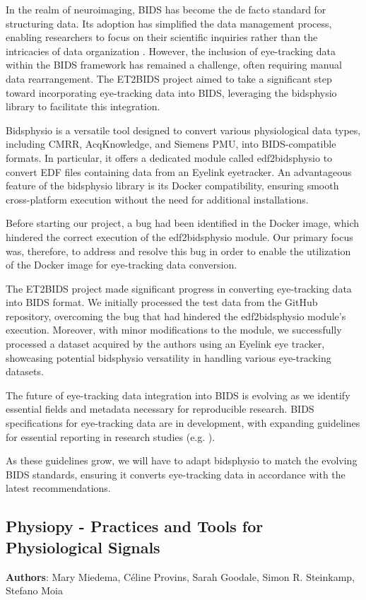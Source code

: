 \documentclass{article}
\begin{document}
In the realm of neuroimaging, BIDS has become the de facto standard for structuring data. Its adoption has simplified the data management process, enabling researchers to focus on their scientific inquiries rather than the intricacies of data organization \cite{gorgolewski2016}. However, the inclusion of eye-tracking data within the BIDS framework has remained a challenge, often requiring manual data rearrangement. The ET2BIDS project aimed to take a significant step toward incorporating eye-tracking data into BIDS, leveraging the bidsphysio library to facilitate this integration.

Bidsphysio is a versatile tool designed to convert various physiological data types, including CMRR, AcqKnowledge, and Siemens PMU, into BIDS-compatible formats. In particular, it offers a dedicated module called edf2bidsphysio to convert EDF files containing data from an Eyelink eyetracker. An advantageous feature of the bidsphysio library is its Docker compatibility, ensuring smooth cross-platform execution without the need for additional installations.

Before starting our project, a bug had been identified in the Docker image, which hindered the correct execution of the edf2bidsphysio module. Our primary focus was, therefore, to address and resolve this bug in order to enable the utilization of the Docker image for eye-tracking data conversion.

The ET2BIDS project made significant progress in converting eye-tracking data into BIDS format. We initially processed the test data from the GitHub repository, overcoming the bug that had hindered the edf2bidsphysio module's execution. Moreover, with minor modifications to the module, we successfully processed a dataset acquired by the authors using an Eyelink eye tracker, showcasing potential bidsphysio versatility in handling various eye-tracking datasets.

The future of eye-tracking data integration into BIDS is evolving as we identify essential fields and metadata necessary for reproducible research. BIDS specifications for eye-tracking data are in development, with expanding guidelines for essential reporting in research studies (e.g. \cite{dunn2023}).

As these guidelines grow, we will have to adapt bidsphysio to match the evolving BIDS standards, ensuring it converts eye-tracking data in accordance with the latest recommendations.



\subsection{Physiopy - Practices and Tools for Physiological Signals}
\textbf{Authors}: Mary Miedema, Céline Provins, Sarah Goodale, Simon R. Steinkamp, Stefano Moia
\end{document}
